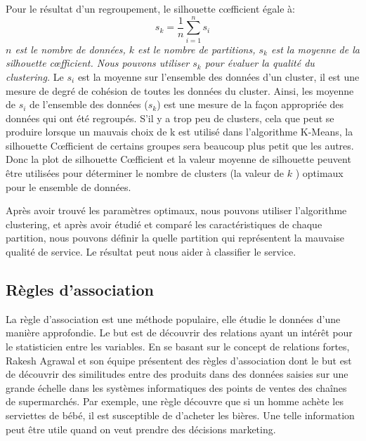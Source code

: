 \begin{enumerate}
Pour le résultat d'un regroupement, le silhouette c\oe fficient égale à:
$$s_{k}=\frac{1}{n}\sum_{i=1}^n s_{i}$$
\emph{$n$ est le nombre de données, $k$ est le nombre de partitions, $s_{k}$ est la moyenne de la silhouette c\oe fficient. Nous pouvons utiliser $s_{k}$ pour évaluer la qualité du clustering.}
\newline
\newline
Le $s_{i}$ est la moyenne sur l'ensemble des données d'un cluster, il est une mesure de degré de cohésion de toutes les données du cluster. Ainsi, les moyenne de $s_{i}$ de l'ensemble des données ($s_{k}$) est une mesure de la façon appropriée des données qui ont été regroupés. S'il y a trop peu de clusters, cela que peut se produire lorsque un mauvais choix de k est utilisé dans l'algorithme K-Means, la silhouette C\oe fficient de certains  groupes sera beaucoup plus petit que les autres. Donc la plot de silhouette C\oe fficient et la valeur moyenne de silhouette peuvent être utilisées pour déterminer le nombre de clusters (la valeur de $k$ ) optimaux pour le ensemble de données.
\end{enumerate} 

Après avoir trouvé les paramètres optimaux, nous pouvons utiliser l'algorithme clustering, et après avoir étudié et comparé les caractéristiques de chaque partition, nous pouvons définir la quelle partition qui représentent la mauvaise qualité de service. Le résultat peut nous aider à classifier le service. 

\subsection{Règles d'association}
La règle d'association est une méthode populaire, elle étudie le données d'une manière approfondie. Le but est de découvrir des relations ayant un intérêt pour le statisticien entre les variables. En se basant sur le concept de relations fortes, Rakesh Agrawal et son équipe présentent des règles d'association dont le but est de découvrir des similitudes entre des produits dans des données saisies sur une grande échelle dans les systèmes informatiques des points de ventes des chaînes de supermarchés. Par exemple, une règle découvre que si un homme achète les serviettes de bébé, il est susceptible de d'acheter les bières. Une telle information peut être utile quand on veut prendre des décisions marketing.


